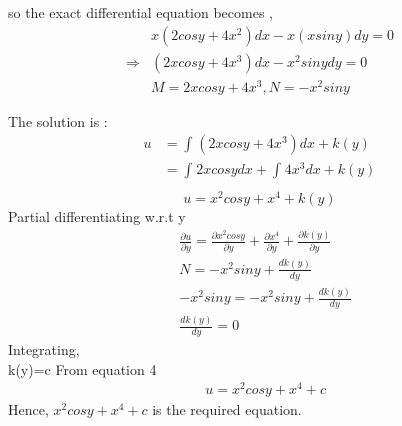 \documentclass{report}
\begin{document}
{    %

    so the exact differential equation becomes ,
    \begin{align*}
        & x(2cosy+4x^2)dx - x(xsiny)dy = 0 \\
        \Rightarrow & (2xcosy+4x^3)dx -x^2sinydy = 0\\        
        & M = 2xcosy +4x^3,N = -x^2siny
    \end{align*}

    The solution is :
    \begin{align*}
        u & = \int_{}^{}(2xcosy+4x^3)dx+k(y)\\
        & = \int_{}^{} 2xcosydx+\int_{}^{}4x^3dx+k(y)\\
    \end{align*}
    \begin{equation}
        u = x^2cosy+x^4+k(y)
    \end{equation}
    Partial differentiating w.r.t y 
    \begin{align*}
        & \frac{\partial u}{\partial y} = \frac{\partial x^2 cosy}{\partial y}+\frac{\partial x^4}{\partial y} + \frac{\partial k(y)}{\partial y}\\
        & N = -x^2siny +\frac{dk(y)}{dy}\\
        & -x^2siny = -x^2siny +\frac{dk(y)}{dy}\\
        & \frac{dk(y)}{dy} = 0
    \end{align*}
    Integrating,\\
    k(y)=c
    From equation 4 
    \begin{align*}
        & u = x^2cosy+ x^4 +c
    \end{align*}
    Hence, $x^2cosy+ x^4 +c$ is the required equation.
}
\end{document}
